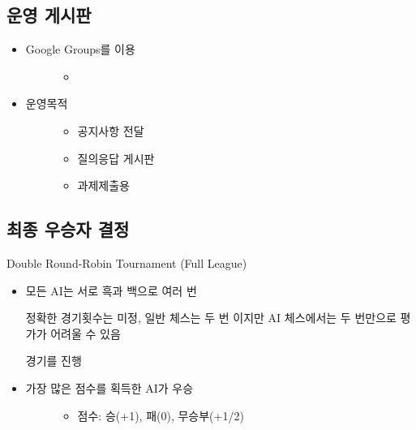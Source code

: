 \documentclass[letterpaper,10pt,english]{sphinxmanual}
\begin{document}
\subsection{운영 게시판}
\label{\detokenize{01-microchess_ai_competition:id7}}\begin{itemize}
\item {} \begin{description}
\item[{Google Groups를 이용}] \leavevmode\begin{itemize}
\item {} 

\end{itemize}

\end{description}

\item {} \begin{description}
\item[{운영목적}] \leavevmode\begin{itemize}
\item {} 
공지사항 전달

\item {} 
질의응답 게시판

\item {} 
과제제출용

\end{itemize}

\end{description}

\end{itemize}


\subsection{최종 우승자 결정}
\label{\detokenize{01-microchess_ai_competition:id8}}
Double Round-Robin Tournament (Full League)
\begin{itemize}
\item {} 
모든 AI는 서로 흑과 백으로 여러 번 %
\begin{footnote}[4]\sphinxAtStartFootnote
정확한 경기횟수는 미정, 일반 체스는 두 번 이지만 AI 체스에서는 두 번만으로 평가가 어려울 수 있음
%
\end{footnote} 경기를 진행

\item {} \begin{description}
\item[{가장 많은 점수를 획득한 AI가 우승}] \leavevmode\begin{itemize}
\item {} 
점수: 승(+1), 패(0), 무승부(+1/2)

\end{itemize}

\end{description}

\end{itemize}
\end{document}
